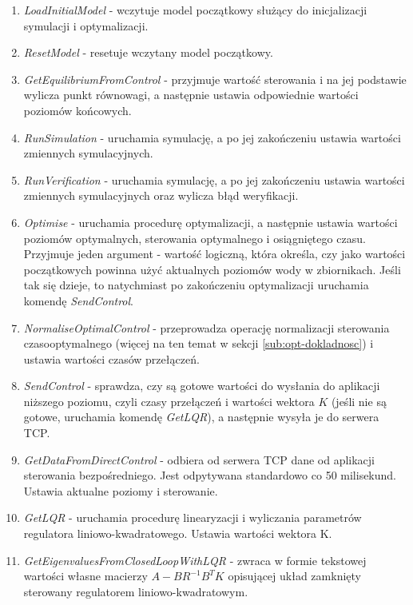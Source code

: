 \begin{enumerate}
\begin{enumerate}
        \item \emph{LoadInitialModel} - wczytuje model początkowy służący do inicjalizacji symulacji i optymalizacji.
        \item \emph{ResetModel} - resetuje wczytany model początkowy.
        \item \emph{GetEquilibriumFromControl} - przyjmuje wartość sterowania i na jej podstawie wylicza punkt równowagi, a następnie ustawia odpowiednie wartości poziomów końcowych.
        \item \emph{RunSimulation} - uruchamia symulację, a po jej zakończeniu ustawia wartości zmiennych symulacyjnych.
        \item \emph{RunVerification} - uruchamia symulację, a po jej zakończeniu ustawia wartości zmiennych symulacyjnych oraz wylicza błąd weryfikacji.
        \item \emph{Optimise} - uruchamia procedurę optymalizacji, a następnie ustawia wartości poziomów optymalnych, sterowania optymalnego i osiągniętego czasu. Przyjmuje jeden argument - wartość logiczną, która określa, czy jako wartości początkowych powinna użyć aktualnych poziomów wody w zbiornikach. Jeśli tak się dzieje, to natychmiast po zakończeniu optymalizacji uruchamia komendę \emph{SendControl}.
        \item \emph{NormaliseOptimalControl} - przeprowadza operację normalizacji sterowania czasooptymalnego (więcej na ten temat w sekcji \ref{sub:opt-dokladnosc}) i ustawia wartości czasów przełączeń.
        \item \emph{SendControl} - sprawdza, czy są gotowe wartości do wysłania do aplikacji niższego poziomu, czyli czasy przełączeń i wartości wektora $K$ (jeśli nie są gotowe, uruchamia komendę \emph{GetLQR}), a następnie wysyła je do serwera TCP.
        \item \emph{GetDataFromDirectControl} - odbiera od serwera TCP dane od aplikacji sterowania bezpośredniego. Jest odpytywana standardowo co 50 milisekund. Ustawia aktualne poziomy i sterowanie.
        \item \emph{GetLQR} - uruchamia procedurę linearyzacji i wyliczania parametrów regulatora liniowo-kwadratowego. Ustawia wartości wektora K.
        \item \emph{GetEigenvaluesFromClosedLoopWithLQR} - zwraca w formie tekstowej wartości własne macierzy $A - BR^{-1}B^{T}K$ opisującej układ zamknięty sterowany regulatorem liniowo-kwadratowym.
    \end{enumerate}
\end{enumerate}

